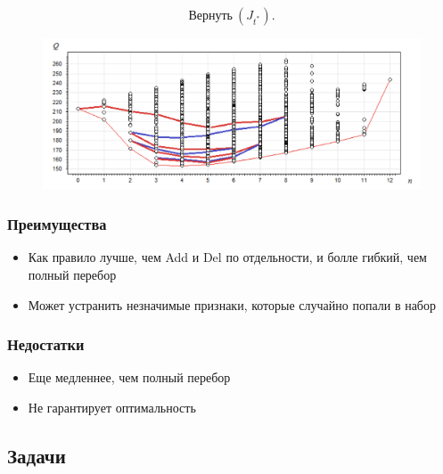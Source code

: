 \[ \text{Вернуть} \ ( J_{t^*} ).\]


\begin{figure}[h!!!!!!!!!!]
    \centering
    \includegraphics[width=1\linewidth]{chapters/feature_selection/add-del.png}
\end{figure}



\subsubsection*{Преимущества}

\begin{itemize}

    \item Как правило лучше, чем Add и Del по отдельности, и болле гибкий, чем полный перебор

    \item Может устранить незначимые признаки, которые случайно попали в набор

\end{itemize}

\subsubsection*{Недостатки}

\begin{itemize}

    \item Еще медленнее, чем полный перебор

    \item Не гарантирует оптимальность

\end{itemize}



\bigskip
\bigskip




\subsection*{Задачи}



